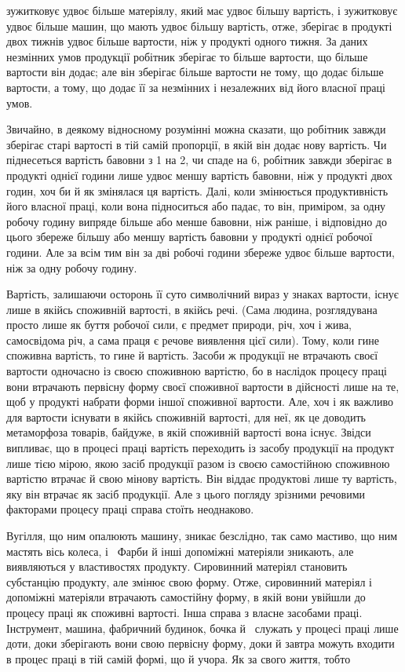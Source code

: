 \parcont{}  %
зужитковує удвоє більше матеріялу, який має удвоє більшу
вартість, і зужитковує удвоє більше машин, що мають удвоє
більшу вартість, отже, зберігає в продукті двох тижнів удвоє
більше вартости, ніж у продукті одного тижня. За даних незмінних
умов продукції робітник зберігає то більше вартости, що
більше вартости він додає; але він зберігає більше вартости не
тому, що додає більше вартости, а тому, що додає її за незмінних
і незалежних від його власної праці умов.

Звичайно, в деякому відносному розумінні можна сказати,
що робітник завжди зберігає старі вартості в тій самій пропорції, в
якій він додає нову вартість. Чи піднесеться вартість бавовни з
1 на 2, чи спаде на 6, робітник завжди
зберігає в продукті однієї години лише удвоє меншу вартість
бавовни, ніж у продукті двох годин, хоч би й як змінялася ця
вартість. Далі, коли змінюється продуктивність його власної праці,
коли вона підноситься або падає, то він, приміром, за одну робочу
годину випряде більше або менше бавовни, ніж раніше, і відповідно
до цього збереже більшу або меншу вартість бавовни у
продукті однієї робочої години. Але за всім тим він за дві робочі
години збереже удвоє більше вартости, ніж за одну робочу годину.

Вартість, залишаючи осторонь її суто символічний вираз у
знаках вартости, існує лише в якійсь споживній вартості, в якійсь
речі. (Сама людина, розглядувана просто лише як буття робочої
сили, є предмет природи, річ, хоч і жива, самосвідома річ, а сама
праця є речове виявлення цієї сили). Тому, коли гине споживна
вартість, то гине й вартість. Засоби ж продукції не втрачають
своєї вартости одночасно із своєю споживною вартістю, бо в наслідок
процесу праці вони втрачають первісну форму своєї споживної
вартости в дійсності лише на те, щоб у продукті набрати форми
іншої споживної вартости. Але, хоч і як важливо для вартости
існувати в якійсь споживній вартості, для неї, як це доводить
метаморфоза товарів, байдуже, в якій споживній вартості вона
існує. Звідси випливає, що в процесі праці вартість переходить
із засобу продукції на продукт лише тією мірою, якою засіб продукції
разом із своєю самостійною споживною вартістю втрачає
й свою мінову вартість. Він віддає продуктові лише ту вартість,
яку він втрачає як засіб продукції. Але з цього погляду зрізними
речовими факторами процесу праці справа стоїть неоднаково.

Вугілля, що ним опалюють машину, зникає безслідно, так
само мастиво, що ним мастять вісь колеса, і~ Фарби й інші
допоміжні матеріяли зникають, але виявляються у властивостях
продукту. Сировинний матеріял становить субстанцію продукту,
але змінює свою форму. Отже, сировинний матеріял і допоміжні
матеріяли втрачають самостійну форму, в якій вони увійшли до
процесу праці як споживні вартості. Інша справа з власне засобами
праці. Інструмент, машина, фабричний будинок, бочка й~ служать у процесі праці лише доти, доки зберігають вони
свою первісну форму, доки й завтра можуть входити в процес
праці в тій самій формі, що й учора. Як за свого життя, тобто
\parbreak{}  %

